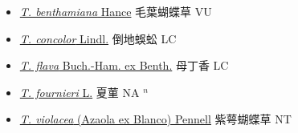\begin{itemize}
  \begin{itemize}
        \item[] \href{http://www.theplantlist.org/tpl1.1/search?q=Torenia+benthamiana}{\textit{T. benthamiana} Hance}   毛葉蝴蝶草 VU
        \item[] \href{http://www.theplantlist.org/tpl1.1/search?q=Torenia+concolor}{\textit{T. concolor} Lindl.}   倒地蜈蚣 LC
        \item[] \href{http://www.theplantlist.org/tpl1.1/search?q=Torenia+flava}{\textit{T. flava} Buch.-Ham. ex Benth.}   母丁香 LC
        \item[] \href{http://www.theplantlist.org/tpl1.1/search?q=Torenia+fournieri}{\textit{T. fournieri} L.}   夏菫 NA $^n$
        \item[] \href{http://www.theplantlist.org/tpl1.1/search?q=Torenia+violacea}{\textit{T. violacea} (Azaola ex Blanco) Pennell}   紫萼蝴蝶草 NT
  \end{itemize}
  \end{itemize}
